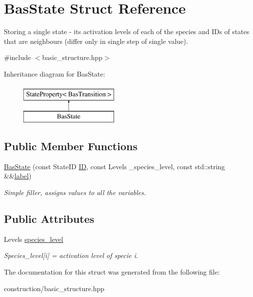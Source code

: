 \hypertarget{structBasState}{\section{\-Bas\-State \-Struct \-Reference}
\label{structBasState}
}


\-Storing a single state -\/ its activation levels of each of the species and \-I\-Ds of states that are neighbours (differ only in single step of single value).  




{\ttfamily \#include $<$basic\-\_\-structure.\-hpp$>$}

\-Inheritance diagram for \-Bas\-State\-:\begin{figure}[H]
\begin{center}
\leavevmode
\includegraphics[height=2.000000cm]{structBasState}
\end{center}
\end{figure}
\subsection*{\-Public \-Member \-Functions}
\begin{DoxyCompactItemize}
\item 
\hypertarget{structBasState_acd4aaaa80478736104c7473a1b0f9285}{\hyperlink{structBasState_acd4aaaa80478736104c7473a1b0f9285}{\-Bas\-State} (const \-State\-I\-D \hyperlink{structStateProperty_af33be20c9033f9b6524c0447e7ac647e}{\-I\-D}, const \-Levels \-\_\-species\-\_\-level, const std\-::string \&\&\hyperlink{structStateProperty_a7cfb634f80b68196eefa54e8ee98a5fe}{label})}\label{structBasState_acd4aaaa80478736104c7473a1b0f9285}

\begin{DoxyCompactList}\small\item\em \-Simple filler, assigns values to all the variables. \end{DoxyCompactList}\end{DoxyCompactItemize}
\subsection*{\-Public \-Attributes}
\begin{DoxyCompactItemize}
\item 
\hypertarget{structBasState_afeedce916ea0dc756525f0f38ec8049b}{\-Levels \hyperlink{structBasState_afeedce916ea0dc756525f0f38ec8049b}{species\-\_\-level}}\label{structBasState_afeedce916ea0dc756525f0f38ec8049b}

\begin{DoxyCompactList}\small\item\em \-Species\-\_\-level\mbox{[}i\mbox{]} = activation level of specie i. \end{DoxyCompactList}\end{DoxyCompactItemize}


\-The documentation for this struct was generated from the following file\-:\begin{DoxyCompactItemize}
\item 
construction/basic\-\_\-structure.\-hpp\end{DoxyCompactItemize}
